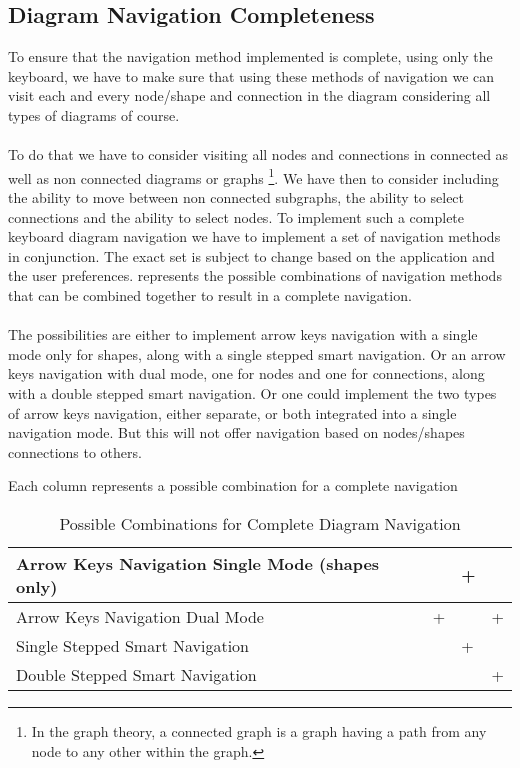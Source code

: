 \subsection{Diagram Navigation Completeness}
To ensure that the navigation method implemented is complete, using only the keyboard, we have to make sure that using these methods of navigation we can visit each and every node/shape and connection in the diagram considering all types of diagrams of course.

\paragraph{}
To do that we have to consider visiting all nodes and connections in connected as well as non connected diagrams or graphs \footnote{In the graph theory, a connected graph is a graph having a path from any node to any other within the graph.}. We have then to consider including the ability to move between non connected subgraphs, the ability to select connections and the ability to select nodes. To implement such a complete keyboard diagram navigation we have to implement a set of navigation methods in conjunction. The exact set is subject to change based on the application and the user preferences.  represents the possible combinations of navigation methods that can be combined together to result in a complete navigation.

\paragraph{}
The possibilities are either to implement arrow keys navigation with a single mode only for shapes, along with a single stepped smart navigation. Or an arrow keys navigation with dual mode, one for nodes and one for connections, along with a double stepped smart navigation. Or one could implement the two types of arrow keys navigation, either separate, or both integrated into a single navigation mode. But this will not offer navigation based on nodes/shapes connections to others.
\begin{table}[!htb]
\begin{center}
\begin{flushleft}
\footnotesize
{Each column represents a possible combination for a complete navigation}\\
\normalsize
\end{flushleft}
	\begin{tabular}{| l | l | l | l |}
	\hline
	Arrow Keys Navigation Single Mode (shapes only)	&   & + &   \\ \hline
	Arrow Keys Navigation Dual Mode			& + &   & + \\ \hline
	Single Stepped Smart Navigation			&   & + &   \\ \hline
	Double Stepped Smart Navigation			&   &   & + \\ \hline
	\end{tabular}
\caption{Possible Combinations for Complete Diagram Navigation}
\end{center}
\end{table}

